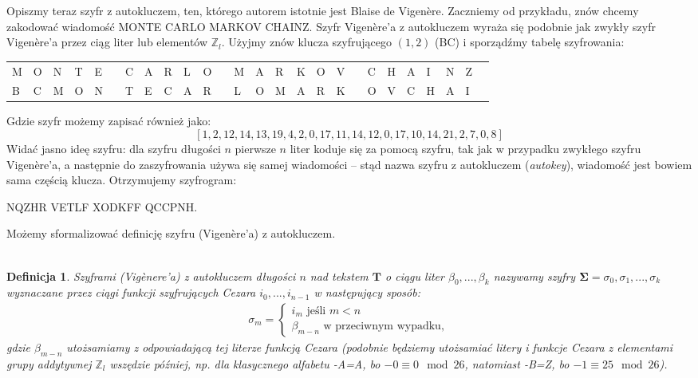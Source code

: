 \documentclass[a4paper]{article}
\theoremstyle{defn}
\newtheorem{defn}{Definicja}[subsection]
\theoremstyle{theorem}
\theoremstyle{lemma}
\theoremstyle{cor}
\theoremstyle{fact}
\begin{document}
Opiszmy teraz szyfr z autokluczem, ten, którego autorem istotnie jest Blaise de Vigenère. Zaczniemy od przykładu, znów chcemy zakodować wiadomość MONTE CARLO MARKOV CHAINZ. Szyfr Vigenère'a z autokluczem wyraża się podobnie jak zwykły szyfr Vigenère'a przez ciąg liter lub elementów $\mathbb{Z}_l$. Użyjmy znów klucza szyfrującego $(1, 2)$ (BC) i sporządźmy tabelę szyfrowania:
\begin{center}\begin{tabular}{|p{1.5mm}|p{1.5mm}|p{1.5mm}|p{1.5mm}|p{1.5mm}|p{1.5mm}|p{1.5mm}|p{1.5mm}|p{1.5mm}|p{1.5mm}|p{1.5mm}|p{1.5mm}|p{1.5mm}|p{1.5mm}|p{1.5mm}|p{1.5mm}|p{1.5mm}|p{1.5mm}|p{1.5mm}|p{1.5mm}|p{1.5mm}|p{1.5mm}|p{1.5mm}|p{1.5mm}|p{1.5mm}|p{1.5mm}|}
    M & O & N & T & E & & C & A & R & L & O & & M & A & R & K & O & V & & C & H & A & I & N & Z \\
    B & C & M & O & N & & T & E & C & A & R & & L & O & M & A & R & K & & O & V & C & H & A & I 
\end{tabular}
\end{center}
Gdzie szyfr możemy zapisać również jako:
$$[1, 2, 12, 14, 13, 19, 4, 2, 0, 17, 11, 14, 12, 0, 17, 10, 14, 21, 2, 7, 0, 8]$$
Widać jasno ideę szyfru: dla szyfru długości $n$ pierwsze $n$ liter koduje się za pomocą szyfru, tak jak w przypadku zwykłego szyfru Vigenère'a, a następnie do zaszyfrowania używa się samej wiadomości – stąd nazwa szyfru z autokluczem (\textit{autokey}), wiadomość jest bowiem sama częścią klucza. Otrzymujemy szyfrogram:\\
\begin{center}
    NQZHR VETLF XODKFF QCCPNH.
\end{center}
Możemy sformalizować definicję szyfru (Vigenère'a) z autokluczem. \\\\
\begin{defn}\label{defn4.2.2}
\textit{Szyframi (Vigènere'a) z autokluczem} długości $n$ nad tekstem $\boldsymbol{T}$ o ciągu liter $\beta_0, ..., \beta_k$ nazywamy szyfry $\boldsymbol{\Sigma} = \sigma_0, \sigma_1, ..., \sigma_k$ wyznaczane przez ciągi funkcji szyfrujących Cezara $i_0, ..., i_{n-1}$ w następujący sposób:
\begin{align*}
\sigma_m = 
\begin{cases}
  i_m \text{ jeśli } m < n  \\
  \beta_{m-n} \text{ w przeciwnym wypadku},
\end{cases}
\end{align*}
gdzie $\beta_{m-n}$ utożsamiamy z odpowiadającą tej literze funkcją Cezara (podobnie będziemy utożsamiać litery i funkcje Cezara z elementami grupy addytywnej $\mathbb{Z}_l$ wszędzie później, np. dla klasycznego alfabetu -A=A, bo $-0 \equiv 0 \mod 26$, natomiast -B=Z, bo $-1 \equiv 25 \mod 26$). 
\end{defn}\
\end{document}
